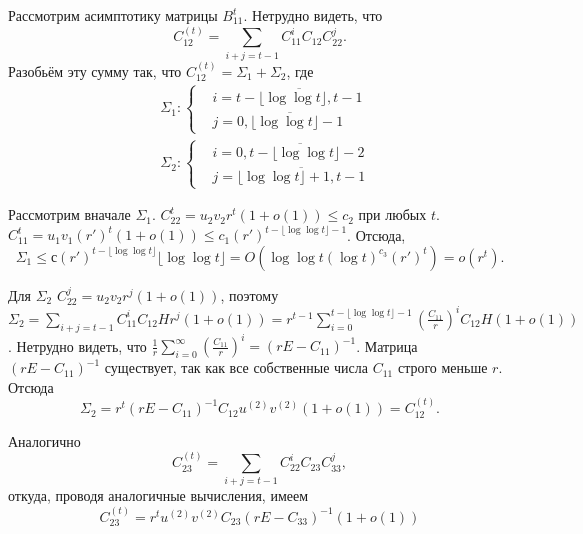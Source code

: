 \documentclass[11pt]{article}
\begin{document}
Рассмотрим асимптотику матрицы $B_{11}^t$. Нетрудно видеть, что
\begin{equation}
    C_{12}^{(t)} = \sum_{i + j = t-1} C_{11}^i C_{12} C_{22}^j.
\end{equation}
Разобьём эту сумму так, что $C_{12}^{(t)} = \Sigma_1 + \Sigma_2$, где
\begin{equation}
    \begin{split}
        &\Sigma_1 : \left\{
        \begin{split}
            &i = \overline{ t - \lfloor \log \log t \rfloor, t-1 } \\
            &j = \overline{ 0, \lfloor \log \log t \rfloor - 1 }
        \end{split} \right. \\
        &\Sigma_2 : \left\{ 
        \begin{split}
            &i = \overline{ 0, t - \lfloor \log \log t \rfloor - 2 } \\
            &j = \overline{ \lfloor \log \log t \rfloor + 1, t-1 }
        \end{split} \right.
    \end{split}
\end{equation}

Рассмотрим вначале $\Sigma_1$. $C_{22}^t = u_2 v_2 r^t (1 + o(1)) \le c_2$ при любых $t$. $C_{11}^t = u_1 v_1 (r')^t (1 + o(1)) \le c_1 (r')^{t - \lfloor \log \log t \rfloor - 1}$. Отсюда,
\begin{equation}
    \Sigma_1 \le с (r')^{t - \lfloor \log \log t \rfloor} \lfloor \log \log t \rfloor = O(\log \log t (\log t)^{c_3} (r')^t) = o(r^t).
\end{equation}

Для $\Sigma_2$ $C_{22}^j = u_2 v_2 r^j (1 + o(1))$, поэтому $\Sigma_2 = \sum_{i + j = t-1} C_{11}^i C_{12} H r^j (1 + o(1)) = r^{t - 1} \sum_{i = 0}^{t - \lfloor \log \log t \rfloor - 1} \left(\frac{C_{11}}{r}\right)^i C_{12} H (1 + o(1))$. Нетрудно видеть, что $\frac{1}{r} \sum_{i = 0}^{\infty} \left(\frac{C_{11}}{r}\right)^i = (rE - C_{11})^{-1}$. Матрица $(rE - C_{11})^{-1}$ существует, так как все собственные числа $C_{11}$ строго меньше $r$. Отсюда
\begin{equation}
    \Sigma_2 = r^t (rE - C_{11})^{-1} C_{12} u^{(2)} v^{(2)} (1 + o(1)) = C_{12}^{(t)}.
\end{equation}

Аналогично
\begin{equation}
    C_{23}^{(t)} = \sum_{i + j = t-1} C_{22}^i C_{23} C_{33}^j,
\end{equation}
откуда, проводя аналогичные вычисления, имеем
\begin{equation}
    C_{23}^{(t)} = r^t u^{(2)} v^{(2)} C_{23} (rE - C_{33})^{-1} (1 + o(1))
\end{equation}
\end{document}
